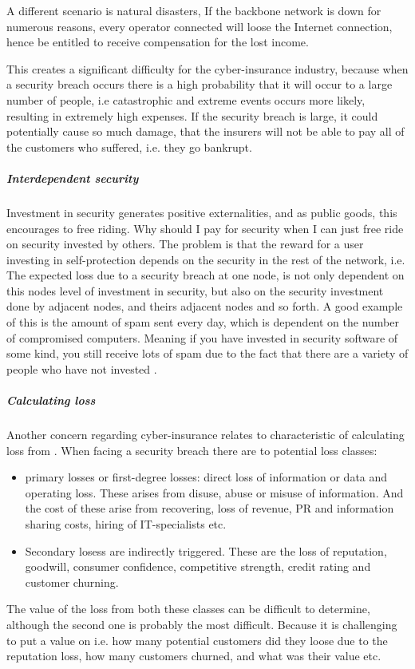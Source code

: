     
  A different scenario is natural disasters, If the backbone network is down for numerous reasons, 
 every operator connected will loose the Internet connection, 
 hence be entitled to receive compensation for the lost income.   
 
This creates a significant difficulty for the cyber-insurance industry, because
when a security breach occurs there is a high probability that it will occur to a large number of people, i.e catastrophic and extreme events occurs more likely, resulting in extremely high expenses.
If the security breach is large, it could potentially cause so much damage, that the insurers will not be able to pay all of the customers who suffered, i.e. they go bankrupt.\cite{bohme2010modeling} 

\subparagraph{Interdependent security}
Investment in security generates positive externalities, and as public goods, this encourages to free riding. Why should I pay for security when I can just free ride on security invested by others.  The problem is that the reward for a user investing in self-protection depends on the security in the rest of the network, i.e. The expected loss due to a security breach at one node, is not only
dependent on this nodes level of investment in security, but also on the security investment done
  by adjacent nodes, and theirs adjacent nodes and so forth. 
  A good example of this is the amount of spam sent every day, which is dependent on the number of compromised computers. Meaning if you have invested in security software of some kind, you still receive lots of spam due to the fact that there are a variety of people who have not invested \cite{towardsInsurable}.

\subparagraph{Calculating loss} Another concern regarding cyber-insurance relates to characteristic of calculating loss from \cite{mehr1980principles}. When facing a security breach there are to potential loss classes:\cite{bandyopadhyay2009managers} 
\begin{itemize}
\item primary losses or first-degree losses: direct loss of information or data and operating loss. 
These arises from disuse, abuse or misuse of information.
 And the cost of these arise from recovering, loss of revenue, 
 PR and information sharing costs, hiring of IT-specialists etc.
 \item Secondary losess are indirectly triggered. These are the loss of reputation, goodwill, 
consumer confidence, competitive strength, credit rating and customer churning. 
\end{itemize}
The value of the loss from both these classes can be difficult to determine, although the second one is probably the most difficult. Because it is challenging to put a value on i.e. how many potential customers did they loose due to the reputation loss, how many customers churned, and what was their value etc.

